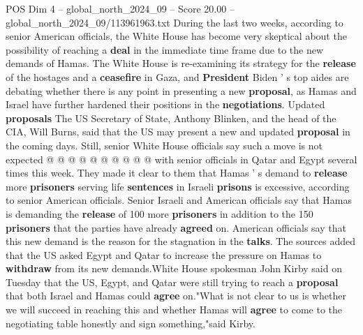 \begin{textsample}{POS Dim 4 – global\_north\_2024\_09 – Score 20.00 – global\_north\_2024\_09/113961963.txt}
During the last two weeks, according to senior American officials, the White House has become very skeptical about the possibility of reaching a \textbf{deal} in the immediate time frame due to the new demands of Hamas.
The White House is re-examining its strategy for the \textbf{release} of the hostages and a \textbf{ceasefire} in Gaza, and \textbf{President} Biden ' s top aides are debating whether there is any point in presenting a new \textbf{proposal}, as Hamas and Israel have further hardened their positions in the \textbf{negotiations}.
Updated \textbf{proposals} The US Secretary of State, Anthony Blinken, and the head of the CIA, Will Burns, said that the US may present a new and updated \textbf{proposal} in the coming days.
Still, senior White House officials say such a move is not expected @ @ @ @ @ @ @ @ @ @ with senior officials in Qatar and Egypt several times this week.
They made it clear to them that Hamas ' s demand to \textbf{release} more \textbf{prisoners} serving life \textbf{sentences} in Israeli \textbf{prisons} is excessive, according to senior American officials.
Senior Israeli and American officials say that Hamas is demanding the \textbf{release} of 100 more \textbf{prisoners} in addition to the 150 \textbf{prisoners} that the parties have already \textbf{agreed} on.
American officials say that this new demand is the reason for the stagnation in the \textbf{talks}.
The sources added that the US asked Egypt and Qatar to increase the pressure on Hamas to \textbf{withdraw} from its new demands.White House spokesman John Kirby said on Tuesday that the US, Egypt, and Qatar were still trying to reach a \textbf{proposal} that both Israel and Hamas could \textbf{agree} on."What is not clear to us is whether we will succeed in reaching this and whether Hamas will \textbf{agree} to come to the negotiating table honestly and sign something,"said Kirby.

\end{textsample}
